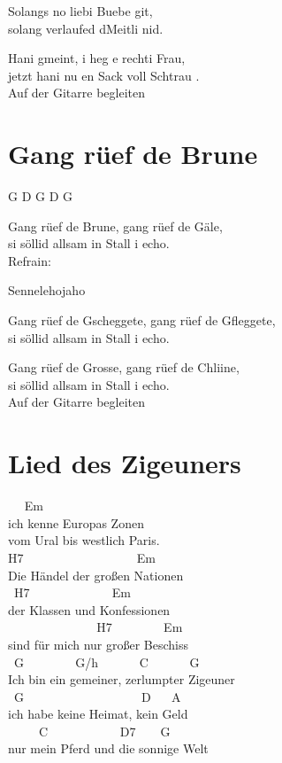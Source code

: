 \documentclass[
  letterpaper,
  twoside=false]{scrbook}
\begin{document}
Solangs no liebi Buebe git,\\
solang verlaufed d\textquotesingle Meitli nid.

Hani gmeint, i heg e rechti Frau,\\
jetzt hani nu en Sack voll Schtrau .\\
Auf der Gitarre begleiten

\hypertarget{gang-ruxfcef-de-brune}{%
\chapter{Gang rüef de Brune}\label{gang-ruxfcef-de-brune}}

G D G D G

Gang rüef de Brune, gang rüef de Gäle,\\
si söllid allsam in Stall i echo.\\
Refrain:

Sennelehojaho

Gang rüef de Gscheggete, gang rüef de Gfleggete,\\
si söllid allsam in Stall i echo.

Gang rüef de Grosse, gang rüef de Chliine,\\
si söllid allsam in Stall i echo.\\
Auf der Gitarre begleiten

\hypertarget{lied-des-zigeuners}{%
\chapter{Lied des Zigeuners}\label{lied-des-zigeuners}}

~ ~Em\\
ich kenne Europas Zonen\\
vom Ural bis westlich Paris.\\
H7 ~ ~ ~ ~ ~ ~ ~ ~ ~ ~ ~Em\\
Die Händel der großen Nationen\\
\hspace*{0.333em} ~H7 ~ ~ ~ ~ ~ ~ ~ ~Em\\
der Klassen und Konfessionen\\
\hspace*{0.333em} ~ ~ ~ ~ ~ ~ ~ ~ ~H7 ~ ~ ~ ~ ~Em ~\\
sind für mich nur großer Beschiss\\
\hspace*{0.333em} ~G ~ ~ ~ ~ ~G/h ~ ~ ~ ~C ~ ~ ~ ~G\\
Ich bin ein gemeiner, zerlumpter Zigeuner\\
\hspace*{0.333em} ~G ~ ~ ~ ~ ~ ~ ~ ~ ~ ~ ~ D ~ ~A\\
ich habe keine Heimat, kein Geld\\
\hspace*{0.333em} ~ ~ ~ C ~ ~ ~ ~ ~ ~ ~D7 ~ ~ G\\
nur mein Pferd und die sonnige Welt
\end{document}
